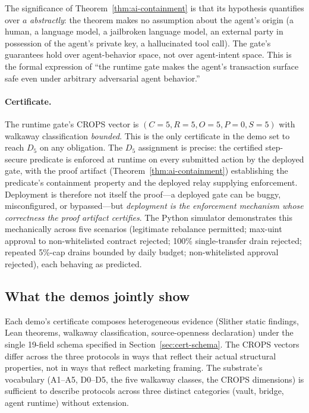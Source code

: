 \documentclass[11pt,a4paper]{article}
\begin{document}
The significance of Theorem~\ref{thm:ai-containment} is that its hypothesis quantifies over $a$ \emph{abstractly}: the theorem makes no assumption about the agent's origin (a human, a language model, a jailbroken language model, an external party in possession of the agent's private key, a hallucinated tool call). The gate's guarantees hold over agent-behavior space, not over agent-intent space. This is the formal expression of ``the runtime gate makes the agent's transaction surface safe even under arbitrary adversarial agent behavior.''

\paragraph{Certificate.} The runtime gate's CROPS vector is $(C{=}5, R{=}5, O{=}5, P{=}0, S{=}5)$ with walkaway classification \emph{bounded}. This is the only certificate in the demo set to reach $D_5$ on any obligation. The $D_5$ assignment is precise: the certified step-secure predicate is enforced at runtime on every submitted action by the deployed gate, with the proof artifact (Theorem~\ref{thm:ai-containment}) establishing the predicate's containment property and the deployed relay supplying enforcement. Deployment is therefore not itself the proof---a deployed gate can be buggy, misconfigured, or bypassed---but \emph{deployment is the enforcement mechanism whose correctness the proof artifact certifies}. The Python simulator demonstrates this mechanically across five scenarios (legitimate rebalance permitted; max-uint approval to non-whitelisted contract rejected; 100\% single-transfer drain rejected; repeated 5\%-cap drains bounded by daily budget; non-whitelisted approval rejected), each behaving as predicted.

\subsection{What the demos jointly show}

Each demo's certificate composes heterogeneous evidence (Slither static findings, Lean theorems, walkaway classification, source-openness declaration) under the single 19-field schema specified in Section~\ref{sec:cert-schema}. The CROPS vectors differ across the three protocols in ways that reflect their actual structural properties, not in ways that reflect marketing framing. The substrate's vocabulary (A1--A5, D0--D5, the five walkaway classes, the CROPS dimensions) is sufficient to describe protocols across three distinct categories (vault, bridge, agent runtime) without extension.
\end{document}

